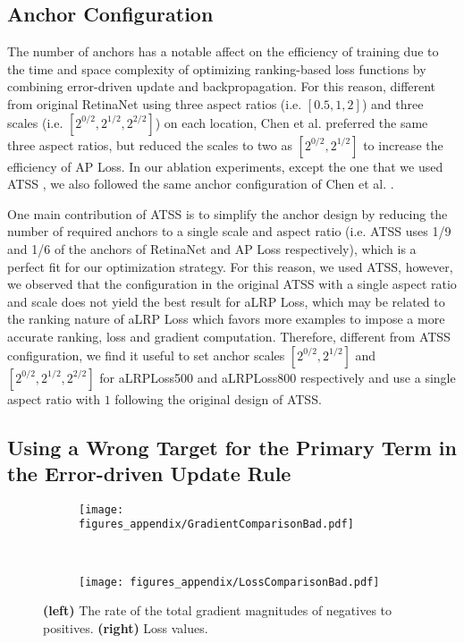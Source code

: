 \documentclass{article}
\begin{document}
\subsection{Anchor Configuration}
The number of anchors has a notable affect on the efficiency of training due to the time and space complexity of optimizing ranking-based loss functions by combining error-driven update and backpropagation. For this reason, different from original RetinaNet using three aspect ratios (i.e. $[0.5, 1, 2]$) and three scales (i.e. $[2^{0/2}, 2^{1/2}, 2^{2/2}]$) on each location, Chen et al. \cite{APLoss} preferred the same three aspect ratios, but reduced the scales to two as $[2^{0/2}, 2^{1/2}]$ to increase the efficiency of AP Loss. In our ablation experiments, except the one that we used ATSS \cite{ATSS}, we also followed the same anchor configuration of Chen et al. \cite{APLoss}.

One main contribution of ATSS is to simplify the anchor design by reducing the number of required anchors to a single scale and aspect ratio (i.e. ATSS uses 1/9 and 1/6 of the anchors of RetinaNet \cite{FocalLoss} and AP Loss \cite{APLoss} respectively), which is a perfect fit for our optimization strategy. For this reason, we used ATSS, however, we observed that the configuration in the original ATSS with a single aspect ratio and scale does not yield the best result for aLRP Loss, which may be related to the ranking nature of aLRP Loss which favors more examples to impose a more accurate ranking, loss and gradient computation. Therefore, different from ATSS configuration, we find it useful to set anchor scales $[2^{0/2}, 2^{1/2}]$ and $[2^{0/2}, 2^{1/2}, 2^{2/2}]$ for aLRPLoss500 and aLRPLoss800 respectively and use a single aspect ratio with $1$ following the original design of ATSS. 

\subsection{Using a Wrong Target for the Primary Term in the Error-driven Update Rule}
\begin{figure*}[t!]
    \begin{subfigure}[t]{0.5\textwidth}
        \centering
        \texttt{[image: figures\_appendix/GradientComparisonBad.pdf]}
    \end{subfigure}
    ~
    \begin{subfigure}[t]{0.47\textwidth}
        \centering
        \texttt{[image: figures\_appendix/LossComparisonBad.pdf]}
    \end{subfigure}    
    \caption{\textbf{(left)} The rate of the total gradient magnitudes of negatives to positives. \textbf{(right)} Loss values. \label{fig:GradComp2}}
\end{figure*}
\end{document}

